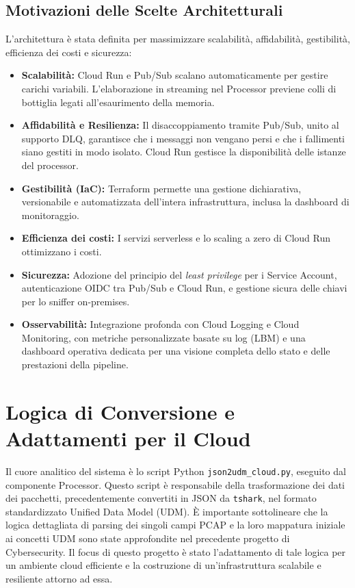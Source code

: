 \documentclass[11pt, a4paper]{article}
\begin{document}
\subsection{Motivazioni delle Scelte Architetturali}
L'architettura è stata definita per massimizzare scalabilità, affidabilità, gestibilità, efficienza dei costi e sicurezza:
\begin{itemize}
    \item \textbf{Scalabilità:} Cloud Run e Pub/Sub scalano automaticamente per gestire carichi variabili. L'elaborazione in streaming nel Processor previene colli di bottiglia legati all'esaurimento della memoria.
    \item \textbf{Affidabilità e Resilienza:} Il disaccoppiamento tramite Pub/Sub, unito al supporto DLQ, garantisce che i messaggi non vengano persi e che i fallimenti siano gestiti in modo isolato. Cloud Run gestisce la disponibilità delle istanze del processor.
    \item \textbf{Gestibilità (IaC):} Terraform permette una gestione dichiarativa, versionabile e automatizzata dell'intera infrastruttura, inclusa la dashboard di monitoraggio.
    \item \textbf{Efficienza dei costi:} I servizi serverless e lo scaling a zero di Cloud Run ottimizzano i costi.
    \item \textbf{Sicurezza:} Adozione del principio del \textit{least privilege} per i Service Account, autenticazione OIDC tra Pub/Sub e Cloud Run, e gestione sicura delle chiavi per lo sniffer on-premises.
    \item \textbf{Osservabilità:} Integrazione profonda con Cloud Logging e Cloud Monitoring, con metriche personalizzate basate su log (LBM) e una dashboard operativa dedicata per una visione completa dello stato e delle prestazioni della pipeline.
\end{itemize}

\section{Logica di Conversione e Adattamenti per il Cloud}
\label{sec:logica_conversione}

Il cuore analitico del sistema è lo script Python \texttt{json2udm\_cloud.py}, eseguito dal componente Processor. Questo script è responsabile della trasformazione dei dati dei pacchetti, precedentemente convertiti in JSON da \texttt{tshark}, nel formato standardizzato Unified Data Model (UDM). È importante sottolineare che la logica dettagliata di parsing dei singoli campi PCAP e la loro mappatura iniziale ai concetti UDM sono state approfondite nel precedente progetto di Cybersecurity. Il focus di questo progetto è stato l'adattamento di tale logica per un ambiente cloud efficiente e la costruzione di un'infrastruttura scalabile e resiliente attorno ad essa.
\end{document}
